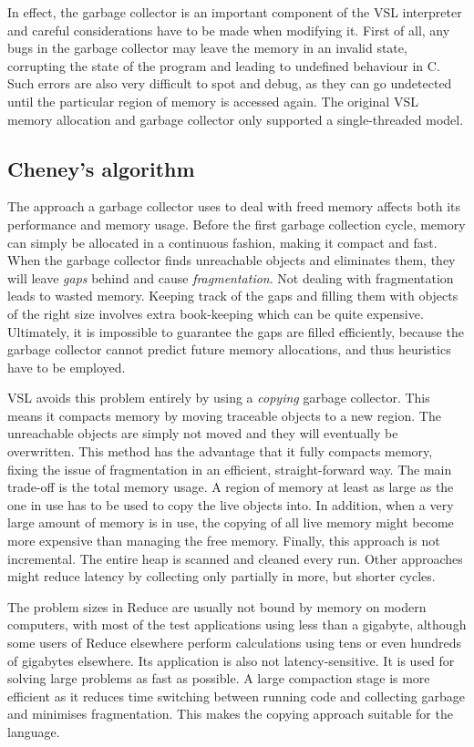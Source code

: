 In effect, the garbage collector is an important component of the VSL interpreter and careful considerations
have to be made when modifying it. First of all, any bugs in the garbage collector may leave the memory in
an invalid state, corrupting the state of the program and leading to undefined behaviour in C. Such errors
are also very difficult to spot and debug, as they can go undetected until the particular region of memory
is accessed again. The original VSL memory allocation and garbage collector only supported a single-threaded model.

\subsection{Cheney's algorithm}
The approach a garbage collector uses to deal with freed memory affects both its performance and memory usage.
Before the first garbage collection cycle, memory can simply be allocated in a continuous fashion, making it
compact and fast. When the garbage collector finds unreachable objects and eliminates them, they will leave \emph{gaps} behind
and cause \emph{fragmentation}. Not dealing with fragmentation leads to wasted memory. Keeping track of the gaps
and filling them with objects of the right size involves extra book-keeping which can be quite expensive. Ultimately,
it is impossible to guarantee the gaps are filled efficiently, because the garbage collector cannot predict future
memory allocations, and thus heuristics have to be employed.

VSL avoids this problem entirely by using a \emph{copying} garbage collector. This means it compacts memory by moving
traceable objects to a new region. The unreachable objects are simply not moved and they will eventually be overwritten.
This method has the advantage that it fully compacts memory, fixing the issue of fragmentation in an efficient,
straight-forward way. The main trade-off is the total memory usage. A region of memory at least
as large as the one in use has to be used to copy the live objects into. In addition, when a very large amount
of memory is in use, the copying of all live memory might become more expensive than managing the free memory.
Finally, this approach is not incremental. The entire heap is scanned and cleaned every run. Other approaches might
reduce latency by collecting only partially in more, but shorter cycles.

The problem sizes in Reduce are usually not bound by memory on modern computers, with most of the test applications
using less than a gigabyte, although some users of Reduce elsewhere perform calculations
using tens or even hundreds of gigabytes elsewhere. Its application is also not latency-sensitive. It is used for
solving large problems as fast as possible. A large compaction stage is more efficient as it reduces time
switching between running code and collecting garbage and minimises fragmentation.
This makes the copying approach suitable for the language.

